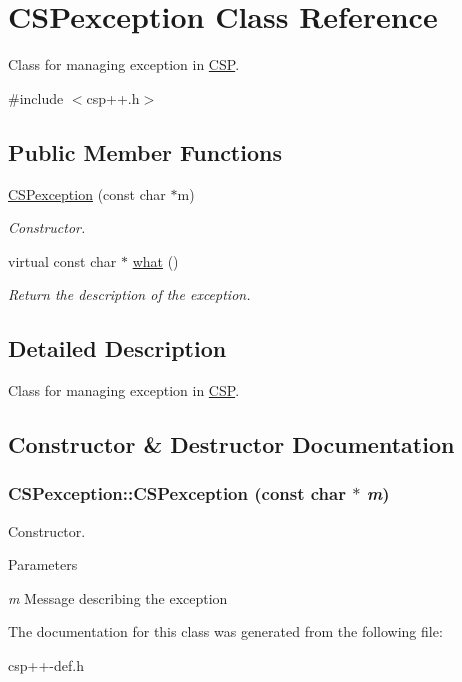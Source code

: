 \hypertarget{classCSPexception}{
\section{CSPexception Class Reference}
\label{classCSPexception}
}


Class for managing exception in \hyperlink{classCSP}{CSP}.  




{\ttfamily \#include $<$csp++.h$>$}

\subsection*{Public Member Functions}
\begin{DoxyCompactItemize}
\item 
\hyperlink{classCSPexception_a810bcfbb11d2e35d7b95f1e2b11b408c}{CSPexception} (const char $\ast$m)
\begin{DoxyCompactList}\small\item\em Constructor. \item\end{DoxyCompactList}\item 
\hypertarget{classCSPexception_a7013e90a6c26ba4c15bc6fbc42be02ef}{
virtual const char $\ast$ \hyperlink{classCSPexception_a7013e90a6c26ba4c15bc6fbc42be02ef}{what} ()}
\label{classCSPexception_a7013e90a6c26ba4c15bc6fbc42be02ef}

\begin{DoxyCompactList}\small\item\em Return the description of the exception. \item\end{DoxyCompactList}\end{DoxyCompactItemize}


\subsection{Detailed Description}
Class for managing exception in \hyperlink{classCSP}{CSP}. 

\subsection{Constructor \& Destructor Documentation}
\hypertarget{classCSPexception_a810bcfbb11d2e35d7b95f1e2b11b408c}{
\subsubsection[{CSPexception}]{\setlength{\rightskip}{0pt plus 5cm}CSPexception::CSPexception (const char $\ast$ {\em m})}}
\label{classCSPexception_a810bcfbb11d2e35d7b95f1e2b11b408c}


Constructor. 


\begin{DoxyParams}{Parameters}
\item[{\em m}]Message describing the exception \end{DoxyParams}


The documentation for this class was generated from the following file:\begin{DoxyCompactItemize}
\item 
csp++-\/def.h\end{DoxyCompactItemize}
